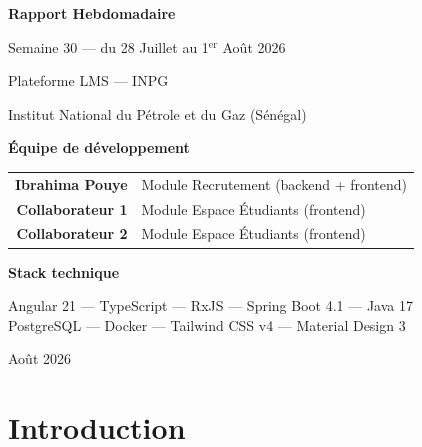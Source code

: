 \documentclass[a4paper,12pt,french]{article}
\begin{document}
\begin{titlepage}
\centering
\vspace*{3cm}

{\Huge\bfseries Rapport Hebdomadaire\par}
\vspace{0.5cm}
{\LARGE Semaine 30 — du 28 Juillet au 1$^\text{er}$ Août 2026\par}
\vspace{1cm}
{\large Plateforme LMS — INPG\par}
{\large Institut National du Pétrole et du Gaz (Sénégal)\par}
\vspace{2cm}

{\large\bfseries Équipe de développement\par}
\vspace{0.3cm}
\begin{tabular}{rl}
\textbf{Ibrahima Pouye} & Module Recrutement (backend + frontend) \\
\textbf{Collaborateur 1} & Module Espace Étudiants (frontend) \\
\textbf{Collaborateur 2} & Module Espace Étudiants (frontend) \\
\end{tabular}
\vspace{2cm}

{\large\bfseries Stack technique\par}
\vspace{0.3cm}
Angular 21 — TypeScript — RxJS — Spring Boot 4.1 — Java 17\\
PostgreSQL — Docker — Tailwind CSS v4 — Material Design 3
\vspace{2cm}

{\large Août 2026\par}
\vfill
\end{titlepage}

\tableofcontents
\newpage

\section{Introduction}
\end{document}
